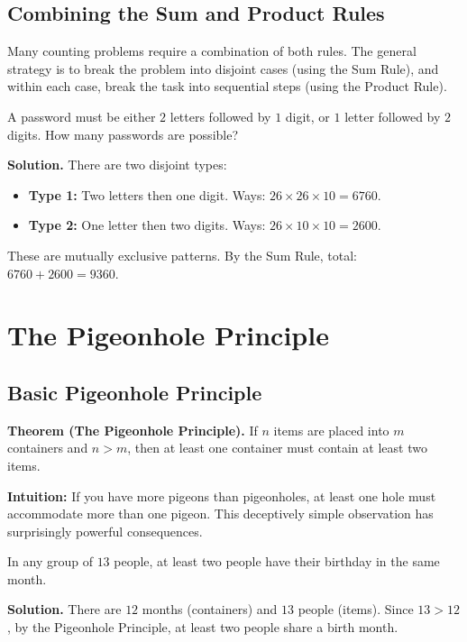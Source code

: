 \documentclass[11pt,a4paper]{article}
\begin{document}
\subsection{Combining the Sum and Product Rules}

Many counting problems require a combination of both rules. The general strategy is to break the problem into disjoint cases (using the Sum Rule), and within each case, break the task into sequential steps (using the Product Rule).

\begin{example}
A password must be either $2$ letters followed by $1$ digit, or $1$ letter followed by $2$ digits. How many passwords are possible?

\textbf{Solution.} There are two disjoint types:
\begin{itemize}[label=--]
    \item \textbf{Type 1:} Two letters then one digit. Ways: $26 \times 26 \times 10 = 6760$.
    \item \textbf{Type 2:} One letter then two digits. Ways: $26 \times 10 \times 10 = 2600$.
\end{itemize}
These are mutually exclusive patterns. By the Sum Rule, total: $6760 + 2600 = 9360$.
\end{example}

\section{The Pigeonhole Principle}

\subsection{Basic Pigeonhole Principle}

\textbf{Theorem (The Pigeonhole Principle).} If $n$ items are placed into $m$ containers and $n > m$, then at least one container must contain at least two items.

\textbf{Intuition:} If you have more pigeons than pigeonholes, at least one hole must accommodate more than one pigeon. This deceptively simple observation has surprisingly powerful consequences.

\begin{example}
In any group of $13$ people, at least two people have their birthday in the same month.

\textbf{Solution.} There are $12$ months (containers) and $13$ people (items). Since $13 > 12$, by the Pigeonhole Principle, at least two people share a birth month.
\end{example}
\end{document}
